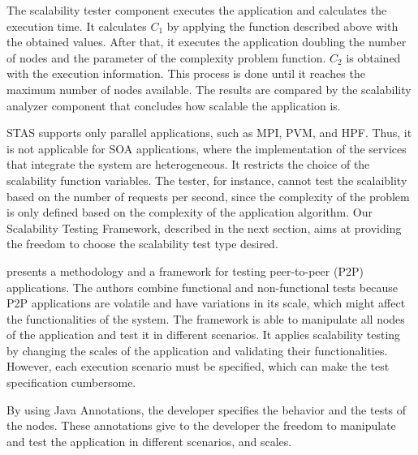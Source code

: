 The scalability tester component executes the application and calculates the execution time.  It calculates $C_1$ by applying the function described above with the obtained values. After that, it executes the application doubling the number of nodes and the parameter of the complexity problem function. $C_2$ is obtained with the execution information. This process is done until it reaches the maximum number of nodes available. The results are compared by the scalability analyzer component that concludes how scalable the application is.

STAS supports only parallel applications, such as MPI, PVM, and HPF. Thus, it is not applicable for SOA applications, where the implementation of the services that integrate the system are heterogeneous. It restricts the choice of the scalability function variables. The tester, for instance, cannot test the scalaiblity based on the number of requests per second, since the complexity of the problem is only defined based on the complexity of the application algorithm. Our Scalability Testing Framework, described in the next section, aims at providing the freedom to choose the scalability test type desired.

\cite{p2p} presents a methodology and a framework for testing peer-to-peer (P2P) applications. The authors combine functional and non-functional tests because P2P applications are volatile and have variations in its scale, which might affect the functionalities of the system. The framework is able to manipulate all nodes of the application and test it in different scenarios. It applies scalability testing by changing the scales of the application and validating their functionalities. However, each execution scenario must be specified, which can make the test specification cumbersome.

By using Java Annotations, the developer specifies the behavior and the tests of the nodes. These annotations give to the developer the freedom to manipulate and test the application in different scenarios, and scales.










